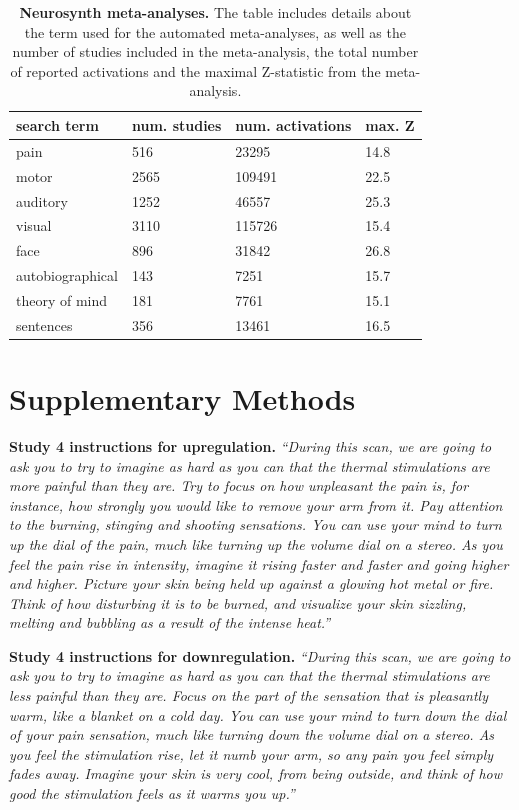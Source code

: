 \documentclass{article}
\begin{document}
\begin{table}
\centering
\caption[]{\textbf{Neurosynth meta-analyses.} The table includes details about the term used for the automated meta-analyses, as well as the number of studies included in the meta-analysis, the total number of reported activations and the maximal Z-statistic from the meta-analysis.}
\label{si-tab-neurosynth}
\begin{tabular}{p{}p{}p{}p{}}
\toprule
search term & num. studies & num. activations & max. Z \\
\hline
pain & 516 & 23295 & 14.8 \\
motor & 2565 & 109491 & 22.5 \\
auditory & 1252 & 46557 & 25.3 \\
visual & 3110 & 115726 & 15.4 \\
face & 896 & 31842 & 26.8 \\
autobiographical & 143 & 7251 & 15.7 \\
theory of mind & 181 & 7761 & 15.1 \\
sentences & 356 & 13461 & 16.5 \\
\bottomrule
\end{tabular}
\end{table}

\section{Supplementary Methods}

\textbf{Study 4 instructions for upregulation.}
\textit{``During this scan, we are going to ask you to try to imagine as hard as you can that the thermal stimulations are more painful than they are. Try to focus on how unpleasant the pain is, for instance, how strongly you would like to remove your arm from it. Pay attention to the burning, stinging and shooting sensations. You can use your mind to turn up the dial of the pain, much like turning up the volume dial on a stereo. As you feel the pain rise in intensity, imagine it rising faster and faster and going higher and higher. Picture your skin being held up against a glowing hot metal or fire. Think of how disturbing it is to be burned, and visualize your skin sizzling, melting and bubbling as a result of the intense heat.''}

\textbf{Study 4 instructions for downregulation.}
\textit{``During this scan, we are going to ask you to try to imagine as hard as you can that the thermal stimulations are less painful than they are. Focus on the part of the sensation that is pleasantly warm, like a blanket on a cold day. You can use your mind to turn down the dial of your pain sensation, much like turning down the volume dial on a stereo. As you feel the stimulation rise, let it numb your arm, so any pain you feel simply fades away. Imagine your skin is very cool, from being outside, and think of how good the stimulation feels as it warms you up.''}
\end{document}
